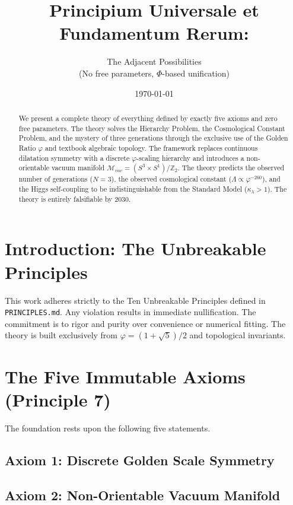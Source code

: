 \documentclass[12pt, a4paper]{article}
\title{\textbf{Principium Universale et Fundamentum Rerum:}}
\author{\large The Adjacent Possibilities\\ (No free parameters, $\Phi$-based unification)}
\date{\today}
\begin{document}
\maketitle

\begin{abstract}
We present a complete theory of everything defined by exactly five axioms and zero free parameters. The theory solves the Hierarchy Problem, the Cosmological Constant Problem, and the mystery of three generations through the exclusive use of the Golden Ratio $\varphi$ and textbook algebraic topology. The framework replaces continuous dilatation symmetry with a discrete $\varphi$-scaling hierarchy and introduces a non-orientable vacuum manifold $\mathcal{M}_{vac} = (S^3 \times S^1)/\mathbb{Z}_2$. The theory predicts the observed number of generations ($N=3$), the observed cosmological constant ($\Lambda \propto \varphi^{-260}$), and the Higgs self-coupling to be indistinguishable from the Standard Model ($\kappa_{\lambda} > 1$). The theory is entirely falsifiable by 2030.
\end{abstract}

\tableofcontents
\newpage

\section{Introduction: The Unbreakable Principles}
This work adheres strictly to the Ten Unbreakable Principles defined in \texttt{PRINCIPLES.md}. Any violation results in immediate nullification. The commitment is to rigor and purity over convenience or numerical fitting. The theory is built exclusively from $\varphi = (1+\sqrt{5})/2$ and topological invariants.

\section{The Five Immutable Axioms (Principle 7)}
The foundation rests upon the following five statements.

\subsection{Axiom 1: Discrete Golden Scale Symmetry}

\subsection{Axiom 2: Non-Orientable Vacuum Manifold}

\end{document}
